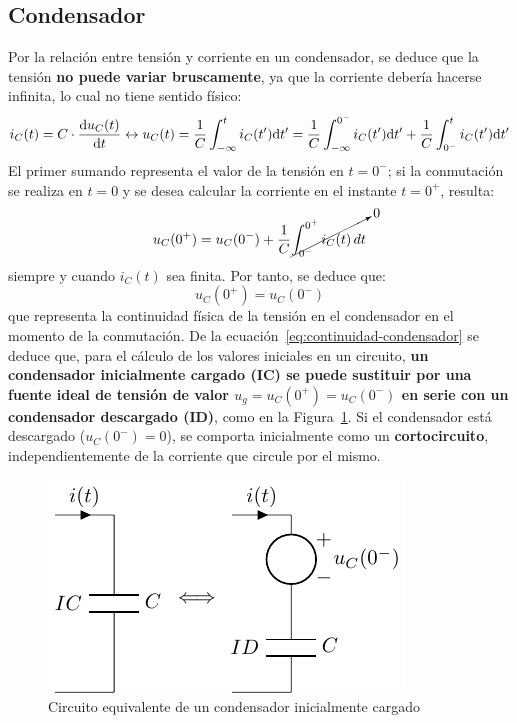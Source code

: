 	
\subsection{Condensador}
Por la relación entre tensión y corriente en un condensador, se deduce
que la tensión \textbf{no puede variar bruscamente}, ya que la
corriente debería hacerse infinita, lo cual no tiene sentido físico:
\begin{equation*}
  i_C(t) = C \cdot \diff{u_C(t)}{t}
  \leftrightarrow
  u_C(t) = \frac{1}{C} \int^t_{-\infty}i_C(t') \mathrm{d}t'= \frac{1}{C} \int^{0^-}_{-\infty}i_C(t')\mathrm{d}t' + \frac{1}{C} \int^{t}_{0^-}i_C(t')\mathrm{d}t'
\end{equation*}
El primer sumando representa el valor de la tensión en $t=0^-$; si la
conmutación se realiza en $t=0$ y se desea calcular la corriente en el
instante $t=0^+$, resulta:
\begin{equation*}
  u_C(0^+)=u_C(0^-)+ \dfrac{1}{C}\cancelto{0}{\int_{0^-}^{0^+} i_C(t)\, dt}
\end{equation*}
siempre y cuando $i_C(t)$ sea finita. Por tanto, se deduce que:
\begin{equation}\label{eq:continuidad-condensador}
  \boxed{u_C(0^+)=u_C(0^-)}
\end{equation}
que representa la continuidad física de la tensión en el condensador
en el momento de la conmutación. De la
ecuación~\eqref{eq:continuidad-condensador} se deduce que, para el
cálculo de los valores iniciales en un circuito, \textbf{un
  condensador inicialmente cargado (IC) se puede sustituir por una
  fuente ideal de tensión de valor $u_g=u_C(0^+)=u_C(0^-)$ en serie
  con un condensador descargado (ID)}, como en la
Figura~\ref{fig:condiciones_iniciales_C}. Si el condensador está
descargado ($u_C(0^-)=0$), se comporta inicialmente como un
\textbf{cortocircuito}, independientemente de la corriente que circule
por el mismo.
\begin{figure}[H]
  \centering \includegraphics{../figs/condiciones_iniciales_C.pdf}
  \caption{Circuito equivalente de un condensador inicialmente
    cargado}
  \label{fig:condiciones_iniciales_C}
\end{figure}
	
